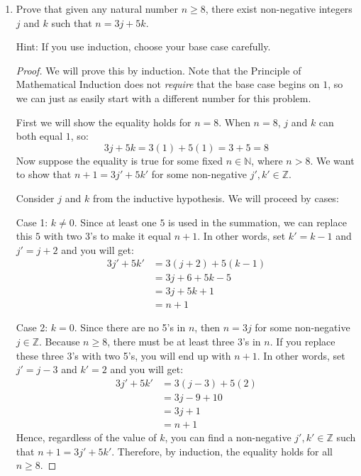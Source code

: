 \documentclass[12pt]{amsart}
\begin{document}
\begin{enumerate}
\item Prove that given any natural number $n\geq 8$, there exist
  non-negative integers $j$ and $k$ such that $n=3j+5k$. 

Hint:  If you use induction, choose your base case carefully.
  
\begin{proof}
We will prove this by induction. Note that the Principle of Mathematical Induction does not {\it require} that the base case begins on $1$, so we can just as easily start with a different number for this problem.

First we will show the equality holds for $n=8$. When $n=8$, $j$ and $k$ can both equal $1$, so:
\[ 3j + 5k = 3(1) + 5(1) = 3 + 5 = 8\]
Now suppose the equality is true for some fixed $n\in \mathbb N$, where $n > 8$. We want to show that $n+1 = 3j' + 5k'$ for some non-negative $j',k'\in \mathbb Z$.

Consider $j$ and $k$ from the inductive hypothesis. We will proceed by cases:

Case 1: $k \ne 0$. Since at least one $5$ is used in the summation, we can replace this $5$ with two 3's to make it equal $n+1$. In other words, set $k' = k-1$ and $j' = j+2$ and you will get:
\begin{align*}
3j' + 5k'& = 3(j+2) + 5(k-1) \\
& = 3j + 6 + 5k - 5 \\
& = 3j+5k +1\\
& = n+1
\end{align*}

Case 2: $k = 0$. Since there are no 5's in $n$, then $n=3j$ for some non-negative $j\in \mathbb Z$. Because $n \geq 8$, there must be at least three 3's in $n$. If you replace these three 3's with two 5's, you will end up with $n+1$. In other words, set $j' = j-3$ and $k' = 2$ and you will get:
\begin{align*}
3j' + 5k'& = 3(j-3) + 5(2) \\
& = 3j - 9 + 10 \\
& = 3j +1\\
& = n+1
\end{align*}
Hence, regardless of the value of $k$, you can find a non-negative $j',k'\in \mathbb Z$ such that $n+1 = 3j' + 5k'$. Therefore, by induction, the equality holds for all $n \geq 8$.
\end{proof}

\end{enumerate}
\end{document}
